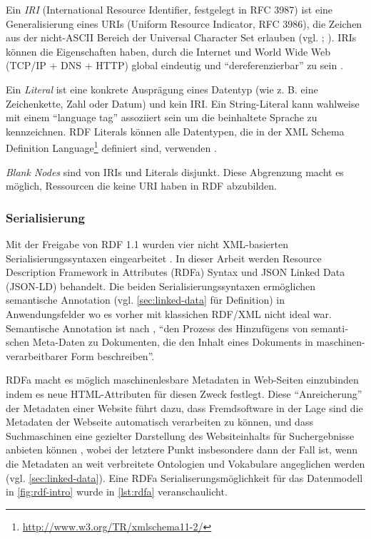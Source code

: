 Ein \textit{IRI} (International Resource Identifier, festgelegt in RFC 3987) ist eine Generalisierung eines URIs (Uniform Resource Indicator, RFC 3986), die Zeichen aus der nicht-ASCII Bereich der Universal Character Set\footnotemark{} erlauben (vgl. \cite[][Abs~3.2]{Schreiber:14:RP}; \cite[]{rfc3987}). IRIs können die Eigenschaften haben, durch die Internet und World Wide Web (TCP/IP + DNS + HTTP) global eindeutig und \hyphenquote{german}{dereferenzierbar} zu sein \parencite[vgl.][Abs.~2]{Jacobs:04:AWW}. 

Ein \textit{Literal} ist eine konkrete Ausprägung eines Datentyp (wie z. B. eine Zeichenkette, Zahl oder Datum) und kein IRI. Ein String-Literal kann wahlweise mit einem \hyphenquote{german}{language tag} assoziiert sein um die beinhaltete Sprache zu kennzeichnen. RDF Literals können alle Datentypen, die in der XML Schema Definition Language\footnote{\url{http://www.w3.org/TR/xmlschema11-2/}} definiert sind, verwenden \parencite[vgl.][Abs. 5]{Wood:14:RCA}. 

\textit{Blank Nodes} sind von IRIs und Literals disjunkt. Diese Abgrenzung macht es möglich, Ressourcen die keine URI haben in RDF abzubilden. 


\subsubsection{Serialisierung}
\label{sec:serialisierung}
Mit der Freigabe von RDF 1.1 wurden vier nicht XML-basierten Serialisierungssyntaxen eingearbeitet \parencite[vgl.][Abs.~3]{Wood:14:WNR}. In dieser Arbeit werden Resource Description Framework in Attributes (RDFa) Syntax und JSON Linked Data (JSON-LD) behandelt. Die beiden Serialisierungssyntaxen ermöglichen semantische Annotation (vgl. \autoref{sec:linked-data} für Definition) in Anwendungsfelder wo es vorher mit klassichen RDF/XML nicht ideal war. Semantische Annotation ist nach \citeauthor[S.~405f]{reif2006semantic}, \hyphenquote{german}{den Prozess des Hinzufügens von semantischen Meta-Daten zu Dokumenten, die den Inhalt eines Dokuments in maschinen-verarbeitbarer Form beschreiben}.

RDFa macht es möglich maschinenlesbare Metadaten in Web-Seiten einzubinden indem es neue HTML-Attributen für diesen Zweck festlegt. Diese \hyphenquote{german}{Anreicherung} der Metadaten einer Website führt dazu, dass Fremdsoftware in der Lage sind die Metadaten der Webseite automatisch verarbeiten zu können, und dass Suchmaschinen eine gezielter Darstellung des Websiteinhalts für Suchergebnisse anbieten können \parencite[vgl.][Abs.~2]{Schreiber:14:RP}, wobei der letztere Punkt insbesondere dann der Fall ist, wenn die Metadaten an weit verbreitete Ontologien und Vokabulare angeglichen werden (vgl. \autoref{sec:linked-data}). Eine RDFa Serialiserungsmöglichkeit für das Datenmodell in \autoref{fig:rdf-intro} wurde in \autoref{lst:rdfa} veranschaulicht.

